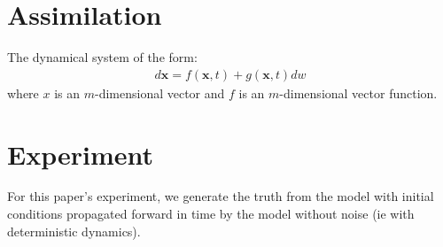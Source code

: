 \documentclass[a4paper, 12pt, notitlepage]{report}
\begin{document}
  \section{Assimilation}
  The dynamical system of the form:
  \begin{equation} \label{idosde}
    \begin{split}
      d\bm{x}=f(\bm{x},t)+g(\bm{x},t)dw
    \end{split}
  \end{equation}
  where \(x\) is an \(m\)-dimensional vector and \(f\) is an \(m\)-dimensional
  vector function.
  \section{Experiment}
  For this paper's experiment, we generate the truth from the model with initial
  conditions propagated forward in time by the model without noise (ie with
  deterministic dynamics).
  \nocite{*}
  \printbibliography
\end{document}
